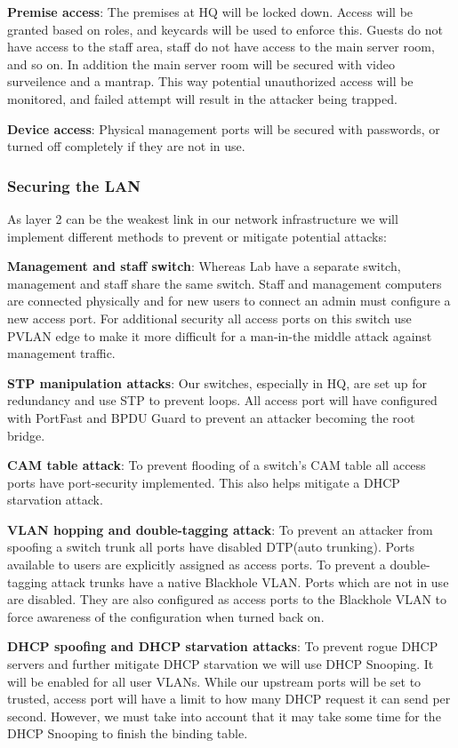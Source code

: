 \textbf{Premise access}: The premises at HQ will be locked down. Access will be granted based on roles, and keycards will be used to enforce this. Guests do not have access to the staff area, staff do not have access to the main server room, and so on. In addition the main server room will be secured with video surveilence and a mantrap. This way potential unauthorized access will be monitored, and failed attempt will result in the attacker being trapped.

\textbf{Device access}: Physical management ports will be secured with passwords, or turned off completely if they are not in use.

\subsubsection{Securing the LAN}
As layer 2 can be the weakest link in our network infrastructure we will implement different methods to prevent or mitigate potential attacks:

\textbf{Management and staff switch}: Whereas Lab have a separate switch, management and staff share the same switch. Staff and management computers are connected physically and for new users to connect an admin must configure a new access port. For additional security all access ports on this switch use PVLAN edge to make it more difficult for a man-in-the middle attack against management traffic.

\textbf{STP manipulation attacks}: Our switches, especially in HQ, are set up for redundancy and use STP to prevent loops. All access port will have configured with PortFast and BPDU Guard to prevent an attacker becoming the root bridge.

\textbf{CAM table attack}: To prevent flooding of a switch's CAM table all access ports have port-security implemented. This also helps mitigate a DHCP starvation attack.

\textbf{VLAN hopping and double-tagging attack}: To prevent an attacker from spoofing a switch trunk all ports have disabled DTP(auto trunking). Ports available to users are explicitly assigned as access ports. To prevent a double-tagging attack trunks have a native Blackhole VLAN. Ports which are not in use are disabled. They are also configured as access ports to the Blackhole VLAN to force awareness of the configuration when turned back on.

\textbf{DHCP spoofing and DHCP starvation attacks}: To prevent rogue DHCP servers and further mitigate DHCP starvation we will use DHCP Snooping. It will be enabled for all user VLANs. While our upstream ports will be set to trusted, access port will have a limit to how many DHCP request it can send per second. However, we must take into account that it may take some time for the DHCP Snooping to finish the binding table. 

